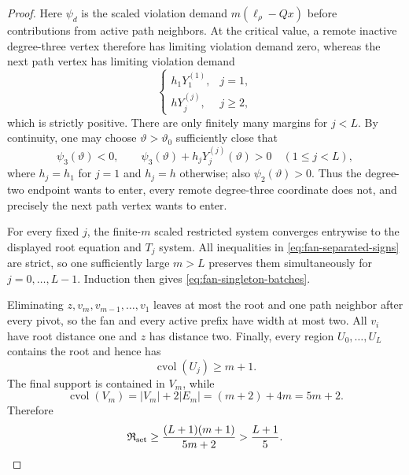\begin{proof}
Here $\psi_d$ is the scaled violation demand
$m(\ell_\rho-Qx)$ before contributions from active path neighbors.  At the
critical value, a remote inactive degree-three vertex therefore has limiting
violation demand zero, whereas the next path vertex has limiting violation
demand
\begin{equation}
 \begin{cases}
  h_1Y_1^{(1)},&j=1,\\
  hY_j^{(j)},&j\geq2,
 \end{cases}
 \label{eq:fan-next-margin}
\end{equation}
which is strictly positive.  There are only finitely many margins for
$j<L$.  By continuity, one may choose
$\vartheta>\vartheta_0$ sufficiently close that
\begin{equation}
 \psi_3(\vartheta)<0,
 \qquad
 \psi_3(\vartheta)+h_jY_j^{(j)}(\vartheta)>0
 \quad(1\leq j<L),
 \label{eq:fan-separated-signs}
\end{equation}
where $h_j=h_1$ for $j=1$ and $h_j=h$ otherwise; also
$\psi_2(\vartheta)>0$.  Thus the degree-two endpoint wants to enter, every
remote degree-three coordinate does not, and precisely the next path vertex
wants to enter.

For every fixed $j$, the finite-$m$ scaled restricted system converges
entrywise to the displayed root equation and $T_j$ system.  All inequalities
in \cref{eq:fan-separated-signs} are strict, so one sufficiently large
$m>L$ preserves them simultaneously for $j=0,\ldots,L-1$.  Induction then
gives \cref{eq:fan-singleton-batches}.

Eliminating $z,v_m,v_{m-1},\ldots,v_1$ leaves at most the root and one path
neighbor after every pivot, so the fan and every active prefix have width at
most two.  All $v_i$ have root distance one and $z$ has distance two.
Finally, every region $U_0,\ldots,U_L$ contains the root and hence has
\begin{equation*}
 \operatorname{cvol}(U_j)\geq m+1.
\end{equation*}
The final support is contained in $V_m$, while
\begin{equation*}
 \operatorname{cvol}(V_m)
 =|V_m|+2|E_m|=(m+2)+4m=5m+2.
\end{equation*}
Therefore
\begin{equation*}
 \mathfrak R_{\rm set}
 \geq\frac{(L+1)(m+1)}{5m+2}
 >\frac{L+1}{5}.
\end{equation*}
\end{proof}

